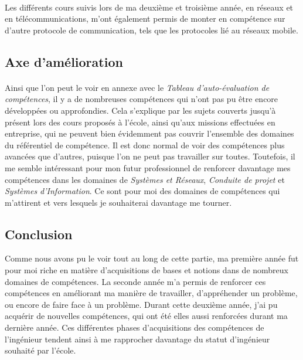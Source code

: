 \documentclass[12pt,a4paper]{report}
\begin{document}
\paragraph*{}Les différents cours suivis lors de ma deuxième et troisième année, en réseaux et en télécommunications, m'ont également permis de monter en compétence sur d'autre protocole de communication, tels que les protocoles lié au réseaux mobile. \\
 
\subsection{Axe d'amélioration}
\paragraph*{} Ainsi que l'on peut le voir en annexe avec le \textit{Tableau d'auto-évaluation de compétences}, il y a de nombreuses compétences qui n'ont pas pu être encore développées ou approfondies. Cela s'explique par les sujets couverts jusqu'à présent lors des cours proposés à l'école, ainsi qu'aux missions effectuées en entreprise, qui ne peuvent bien évidemment pas couvrir l'ensemble des domaines du référentiel de compétence. Il est donc normal de voir des compétences plus avancées que d'autres, puisque l'on ne peut pas travailler sur toutes. Toutefois, il me semble intéressant pour mon futur professionnel de renforcer davantage mes compétences dans les domaines de \textit{Systèmes et Réseaux}, \textit{Conduite de projet} et \textit{Systèmes d'Information}. Ce sont pour moi des domaines de compétences qui m'attirent et vers lesquels je souhaiterai davantage me tourner. \\

\subsection{Conclusion}
Comme nous avons pu le voir tout au long de cette partie, ma première année fut pour moi riche en matière d'acquisitions de bases et notions dans de nombreux domaines de compétences. La seconde année m'a permis de renforcer ces compétences en améliorant ma manière de travailler, d'appréhender un problème, ou encore de faire face à un problème. Durant cette deuxième année, j'ai pu acquérir de nouvelles compétences, qui ont été elles aussi renforcées durant ma dernière année. Ces différentes phases d'acquisitions des compétences de l'ingénieur tendent ainsi à me rapprocher davantage du statut d'ingénieur souhaité par l'école. 
\end{document}
